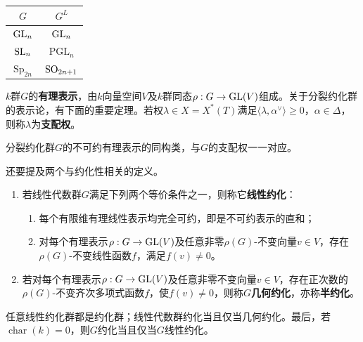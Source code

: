\begin{example}\label{L18S2O6}
\begin{center}\begin{tabular}{c|c}$G$&$G^L$\\\hline$\operatorname{GL}_n$&$\operatorname{GL}_n$\\$\operatorname{SL}_n$&$\operatorname{PGL}_n$\\$\operatorname{Sp}_{2n}$&$\operatorname{SO}_{2n+1}$\end{tabular}\end{center}
\end{example}
$k$群$G$的\textbf{有理表示}，由$k$向量空间$V$及$k$群同态$\rho:G\to\operatorname{GL}(V)$组成。关于分裂约化群的表示论，有下面的重要定理。若权$\lambda\in X=X^*(T)$满足$\langle\lambda,\alpha^\vee\rangle\ge0$，$\alpha\in\Delta$，则称$\lambda$为\textbf{支配权}。
\begin{theorem}\label{L18S2O7}
分裂约化群$G$的不可约有理表示的同构类，与$G$的支配权一一对应。
\end{theorem}
还要提及两个与约化性相关的定义。
\begin{definition}\label{L18S2O8}
\begin{enumerate}[label=(\arabic*)]
\item 若线性代数群$G$满足下列两个等价条件之一，则称它\textbf{线性约化}：
\begin{enumerate}[label=(\alph*)]
\item 每个有限维有理线性表示均完全可约，即是不可约表示的直和；
\item 对每个有理表示$\rho:G\to\operatorname{GL}(V)$及任意非零$\rho(G)$-不变向量$v\in V$，存在$\rho(G)$-不变线性函数$f$，满足$f(v)\ne0$。
\end{enumerate}
\item 若对每个有理表示$\rho:G\to\operatorname{GL}(V)$及任意非零不变向量$v\in V$，存在正次数的$\rho(G)$-不变齐次多项式函数$f$，使$f(v)\ne0$，则称$G$\textbf{几何约化}，亦称\textbf{半约化}。
\end{enumerate}
\end{definition}
任意线性约化群都是约化群；线性代数群约化当且仅当几何约化。最后，若$\operatorname{char}(k)=0$，则$G$约化当且仅当$G$线性约化。
